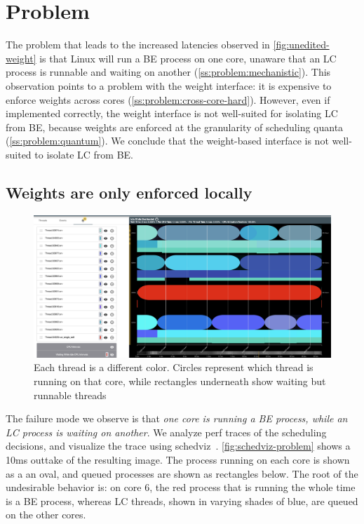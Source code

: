 \section{Problem}\label{s:problem}

The problem that leads to the increased latencies observed in
\autoref{fig:unedited-weight} is that Linux will run a BE process on one core,
unaware that an LC process is runnable and waiting on another
(\autoref{ss:problem:mechanistic}). This observation points to a problem with
the \cgroups{} weight interface: it is expensive to enforce weights across cores
(\autoref{ss:problem:cross-core-hard}). However, even if implemented correctly,
the \cgroups{} weight interface is not well-suited for isolating LC from BE,
because weights are enforced at the granularity of scheduling quanta
(\autoref{ss:problem:quantum}). We conclude that the weight-based interface is
not well-suited to isolate LC from BE.

\subsection{Weights are only enforced locally}\label{ss:problem:mechanistic}

\begin{figure}[t]
    \centering
    \includegraphics[width=\columnwidth]{graphs/schedviz-problem.png}
    \caption{Each thread is a different color. Circles represent which
    thread is running on that core, while rectangles underneath show waiting but
    runnable threads
    }\label{fig:schedviz-problem}
\end{figure}

The failure mode we observe is that \textit{one core is running a BE process,
while an LC process is waiting on another}. We analyze perf traces of the
scheduling decisions, and visualize the trace using
schedviz~\cite{schedviz-tool}. \autoref{fig:schedviz-problem} shows a 10ms
outtake of the resulting image. The process running on each core is shown as a
an oval, and queued processes are shown as rectangles below. The root of the
undesirable behavior is: on core 6, the red process that is running the whole
time is a BE process, whereas LC threads, shown in varying shades of blue, are
queued on the other cores.

